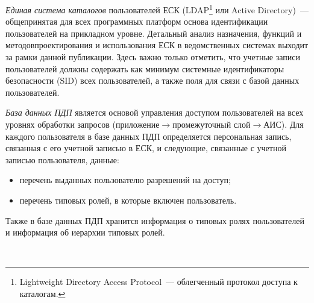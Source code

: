 \begin{multicols}{2}
      \textit{Единая система каталогов} пользователей ЕСК (LDAP\footnote{Lightweight Directory Access Protocol~---
      облегченный протокол доступа к каталогам.} 
      или Active Directory)~--- 
общепринятая для всех программных платформ основа идентификации пользователей на 
прикладном уровне. Детальный анализ назначения, функций и методов\linebreak проектирования и 
использования ЕСК в ведомственных системах выходит за рамки данной публикации. Здесь 
важно только отметить, что учетные записи пользователей должны содержать как минимум 
сис\-тем\-ные идентификаторы безопасности (SID) всех пользователей, а также поля для связи с 
базой данных пользователей.
      
      \textit{База данных ПДП} является основой управления 
доступом пользователей на всех уровнях обработки запросов 
(приложение\;$\rightarrow$\;промежуточный слой\;$\rightarrow$\;АИС). Для каждого 
пользователя в базе данных ПДП определяется персональная запись, связанная с его учетной записью в 
ЕСК, и следующие, связанные с учетной записью пользователя, данные: 
      \begin{itemize}
\item перечень выданных пользователю разрешений на доступ;
\item перечень типовых ролей, в которые включен пользователь.
\end{itemize}

      Также в базе данных ПДП хранится информация о типовых ролях пользователей и информация 
об иерархии типовых ролей.

\begin{figure*} %
\vspace*{1pt}
\begin{center}
\mbox{%
\epsfxsize=110.676mm
}
\end{center}
\vspace*{-3pt}
       \vspace*{6pt}
       \end{figure*} 


\end{multicols}
